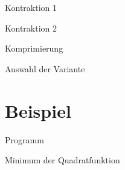 \documentclass[\outputformat]{beamer}
\begin{document}
\begin{frame}{Kontraktion 1}

\end{frame}

\begin{frame}{Kontraktion 2}

\end{frame}

\begin{frame}{Komprimierung}

\end{frame}

\begin{frame}{Auswahl der Variante}

\end{frame}


\section{Beispiel}
\begin{frame}{Programm}\tableofcontents[currentsection]\end{frame}

\begin{frame}{Minimum der Quadratfunktion}

\end{frame}
\end{document}
